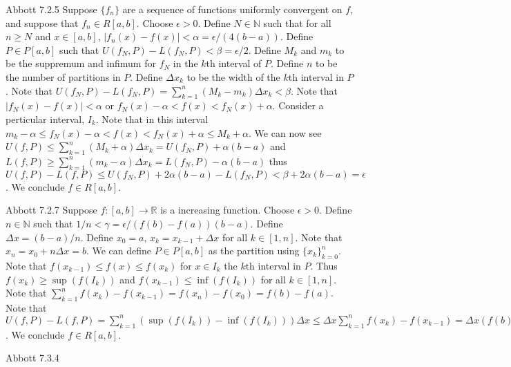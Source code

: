 \documentclass[12pt]{article}
\makeatletter
\theoremstyle{homework}
\newenvironment{exercise}[1]
{\def\@currentlabel{#1}\exercisecore}
{\endexercisecore}
\makeatother
\begin{document}
\begin{exercise}
1
Abbott 7.2.5
\end{exercise}
Suppose $\{f_n\}$ are a sequence of functions uniformly convergent on $f$, and suppose that $f_n\in R[a,b]$.  Choose $\epsilon>0$.  Define $N\in\mathbb{N}$ such that for all $n\geq N$ and $x\in[a,b]$, $|f_n(x)-f(x)|<\alpha=\epsilon/(4(b-a))$.  Define $P\in P[a,b]$ such that $U(f_N,P)-L(f_N,P)<\beta=\epsilon/2$.  Define $M_k$ and $m_k$ to be the suppremum and infimum for $f_N$ in the $k$th interval of $P$.  Define $n$ to be the number of partitions in $P$.  Define $\Delta x_k$ to be the width of the $k$th interval in $P$.  Note that $U(f_N,P)-L(f_N,P)=\sum^n_{k=1} (M_k-m_k)\Delta x_k<\beta$.  Note that $|f_N(x)-f(x)|<\alpha$ or $f_N(x)-\alpha<f(x)<f_N(x)+\alpha$.  Consider a perticular interval, $I_k$.  Note that in this interval $m_k-\alpha\leq f_N(x)-\alpha<f(x)<f_N(x)+\alpha \leq M_k+\alpha$.  We can now see $U(f,P)\leq \sum^n_{k=1} (M_k+\alpha) \Delta x_k=U(f_N,P)+ \alpha(b-a)$ and $L(f,P)\geq \sum^n_{k=1} (m_k-\alpha) \Delta x_k=L(f_N,P)- \alpha(b-a)$ thus $U(f,P)-L(f,P)\leq U(f_N,P)+ 2\alpha(b-a) -L(f_N,P)<\beta+2\alpha(b-a)=\epsilon$.  We conclude $f\in R[a,b]$.

\begin{exercise}
2
Abbott 7.2.7
\end{exercise}
Suppose $f:[a,b]\rightarrow\mathbb{R}$ is a increasing function.  Choose $\epsilon>0$.  Define $n\in\mathbb{N}$ such that $1/n<\gamma=\epsilon/(f(b)-f(a))(b-a)$.  Define $\Delta x=(b-a)/n$.  Define $x_0=a$, $x_k=x_{k-1}+\Delta x$ for all $k\in [1,n]$.  Note that $x_n=x_0+n\Delta x=b$.  We can define $P\in P[a,b]$ as the partition using $\{x_k \}_{k=0}^n$.  Note that $f(x_{k-1}) \leq f(x)\leq f(x_k)$ for $x\in I_k$ the $k$th interval in $P$.  Thus $f(x_k)\geq \sup(f(I_k))$ and $f(x_{k-1})\leq \inf(f(I_k))$ for all $k\in [1,n]$.  Note that $\sum_{k=1}^n f(x_k)-f(x_{k-1})=f(x_n)-f(x_0)=f(b)-f(a)$.  Note that $U(f,P)-L(f,P)= \sum_{k=1}^n(\sup(f(I_k))-\inf(f(I_k)))\Delta x\leq \Delta x\sum_{k=1}^n f(x_k)-f(x_{k-1})=\Delta x (f(b)-f(a))=(f(b)-f(a))(b-a)/n<(f(b)-f(a))(b-a)\gamma=\epsilon$.  We conclude $f\in R[a,b]$.

\begin{exercise}
3
Abbott 7.3.4
\end{exercise}
\end{document}
